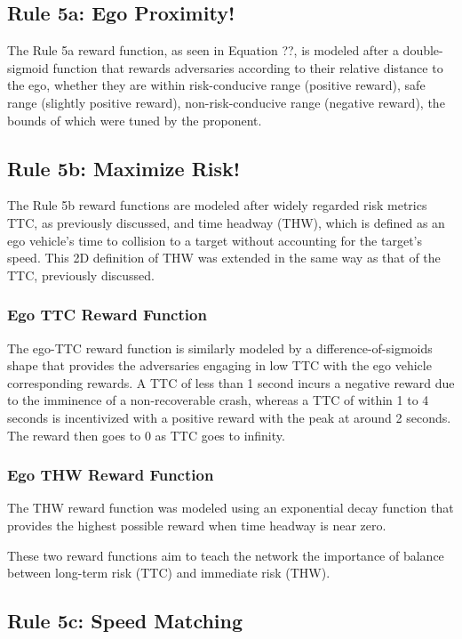 \documentclass[12pt, a4paper]{report}
\begin{document}
\subsection{Rule 5a: Ego Proximity!}

The Rule 5a reward function, as seen in Equation ??, is modeled after a double-sigmoid function that rewards adversaries according to their relative distance to the ego, whether they are within risk-conducive range (positive reward), safe range (slightly positive reward), non-risk-conducive range (negative reward), the bounds of which were tuned by the proponent.

\subsection{Rule 5b: Maximize Risk!}

The Rule 5b reward functions are modeled after widely regarded risk metrics TTC, as previously discussed, and time headway (THW), which is defined as an ego vehicle’s time to collision to a target without accounting for the target’s speed. This 2D definition of THW was extended in the same way as that of the TTC, previously discussed.

\subsubsection{Ego TTC Reward Function}

The ego-TTC reward function is similarly modeled by a difference-of-sigmoids shape that provides the adversaries engaging in low TTC with the ego vehicle corresponding rewards. A TTC of less than 1 second incurs a negative reward due to the imminence of a non-recoverable crash, whereas a TTC of within 1 to 4 seconds is incentivized with a positive reward with the peak at around 2 seconds. The reward then goes to 0 as TTC goes to infinity.

\subsubsection{Ego THW Reward Function}

The THW reward function was modeled using an exponential decay function that provides the highest possible reward when time headway is near zero.

These two reward functions aim to teach the network the importance of balance between long-term risk (TTC) and immediate risk (THW).

\subsection{Rule 5c: Speed Matching}
\end{document}
